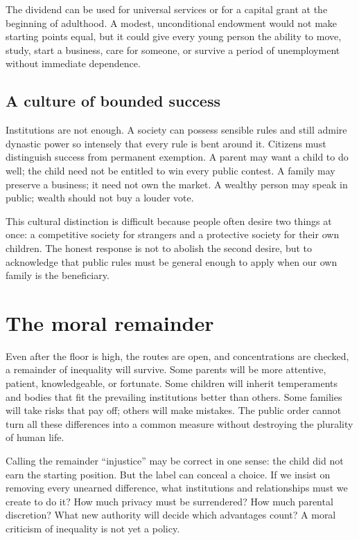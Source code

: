﻿\documentclass[12pt,a4paper]{book}
\begin{document}
The dividend can be used for universal services or for a capital grant at
the beginning of adulthood.  A modest, unconditional endowment would not
make starting points equal, but it could give every young person the ability
to move, study, start a business, care for someone, or survive a period of
unemployment without immediate dependence.

\subsection{A culture of bounded success}

Institutions are not enough.  A society can possess sensible rules and
still admire dynastic power so intensely that every rule is bent around it.
Citizens must distinguish success from permanent exemption.  A parent may
want a child to do well; the child need not be entitled to win every public
contest.  A family may preserve a business; it need not own the market.  A
wealthy person may speak in public; wealth should not buy a louder vote.

This cultural distinction is difficult because people often desire two
things at once: a competitive society for strangers and a protective society
for their own children.  The honest response is not to abolish the second
desire, but to acknowledge that public rules must be general enough to apply
when our own family is the beneficiary.

\section{The moral remainder}

Even after the floor is high, the routes are open, and concentrations are
checked, a remainder of inequality will survive.  Some parents will be more
attentive, patient, knowledgeable, or fortunate.  Some children will inherit
temperaments and bodies that fit the prevailing institutions better than
others.  Some families will take risks that pay off; others will make
mistakes.  The public order cannot turn all these differences into a common
measure without destroying the plurality of human life.

Calling the remainder ``injustice'' may be correct in one sense: the child
did not earn the starting position.  But the label can conceal a choice.  If
we insist on removing every unearned difference, what institutions and
relationships must we create to do it?  How much privacy must be surrendered?
How much parental discretion?  What new authority will decide which
advantages count?  A moral criticism of inequality is not yet a policy.
\end{document}
